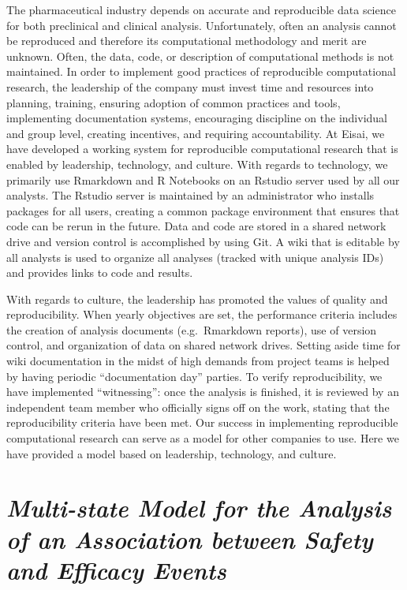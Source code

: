 \documentclass[]{book}
\theoremstyle{definition}
\theoremstyle{definition}
\theoremstyle{definition}
\theoremstyle{remark}
\begin{document}
The pharmaceutical industry depends on accurate and reproducible data
science for both preclinical and clinical analysis. Unfortunately, often
an analysis cannot be reproduced and therefore its computational
methodology and merit are unknown. Often, the data, code, or description
of computational methods is not maintained. In order to implement good
practices of reproducible computational research, the leadership of the
company must invest time and resources into planning, training, ensuring
adoption of common practices and tools, implementing documentation
systems, encouraging discipline on the individual and group level,
creating incentives, and requiring accountability. At Eisai, we have
developed a working system for reproducible computational research that
is enabled by leadership, technology, and culture. With regards to
technology, we primarily use Rmarkdown and R Notebooks on an Rstudio
server used by all our analysts. The Rstudio server is maintained by an
administrator who installs packages for all users, creating a common
package environment that ensures that code can be rerun in the future.
Data and code are stored in a shared network drive and version control
is accomplished by using Git. A wiki that is editable by all analysts is
used to organize all analyses (tracked with unique analysis IDs) and
provides links to code and results.

With regards to culture, the leadership has promoted the values of
quality and reproducibility. When yearly objectives are set, the
performance criteria includes the creation of analysis documents
(e.g.~Rmarkdown reports), use of version control, and organization of
data on shared network drives. Setting aside time for wiki documentation
in the midst of high demands from project teams is helped by having
periodic ``documentation day'' parties. To verify reproducibility, we
have implemented ``witnessing'': once the analysis is finished, it is
reviewed by an independent team member who officially signs off on the
work, stating that the reproducibility criteria have been met. Our
success in implementing reproducible computational research can serve as
a model for other companies to use. Here we have provided a model based
on leadership, technology, and culture.

\hypertarget{multi-state-model-for-the-analysis-of-an-association-between-safety-and-efficacy-events}{%
\section{\texorpdfstring{\emph{Multi-state Model for the Analysis of an
Association between Safety and Efficacy
Events}}{Multi-state Model for the Analysis of an Association between Safety and Efficacy Events}}\label{multi-state-model-for-the-analysis-of-an-association-between-safety-and-efficacy-events}}
\end{document}
